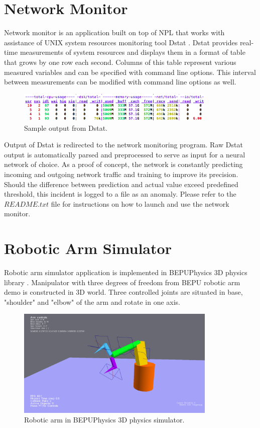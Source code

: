 \documentclass[12pt,oneside]{fithesis2}
\begin{document}
\section{Network Monitor}
Network monitor is an application built on top of NPL that works with assistance of UNIX system resources monitoring tool Dstat \cite{dstat}. Dstat provides real-time measurements of system resources and displays them in a format of table that grows by one row each second. Columns of this table represent various measured variables and can be specified with command line options. This interval between measurements can be modified with command line options as well. \par

\begin{figure}[H]
	\centering
	\includegraphics[width=360px]{dstat_sample.png}
	\caption{Sample output from Dstat.}
\end{figure}

Output of Dstat is redirected to the network monitoring program. Raw Dstat output is automatically parsed and preprocessed to serve as input for a neural network of choice. As a proof of concept, the network is constantly predicting incoming and outgoing network traffic and training to improve its precision. Should the difference between prediction and actual value exceed predefined threshold, this incident is logged to a file as an anomaly. Please refer to the $README.txt$ file for instructions on how to launch and use the network monitor.\par


\section{Robotic Arm Simulator}
Robotic arm simulator application is implemented in BEPUPhysics 3D physics library \cite{bepuphysics}. Manipulator with three degrees of freedom from BEPU robotic arm demo \cite{bepu-robotarm-demo} is constructed in 3D world. Three controlled joints are situated in base, "shoulder" and "elbow" of the arm and rotate in one axis.\par

	\begin{figure}[ht]
		\centering
		\includegraphics[width=360px]{roboticarm.png}
		\caption{Robotic arm in BEPUPhysics 3D physics simulator.}
	\end{figure}
\end{document}
